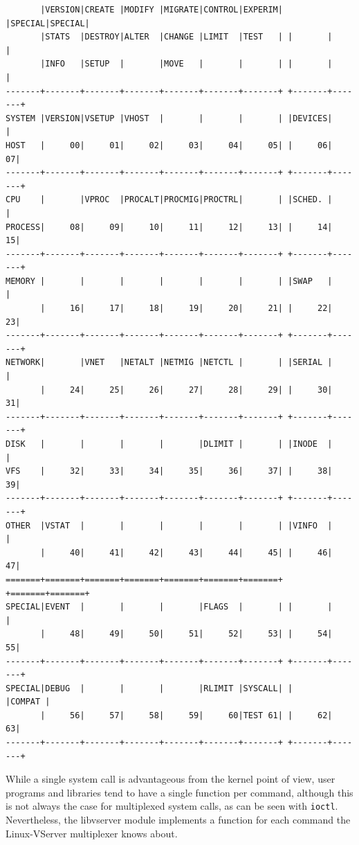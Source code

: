 \begin{center}
\small
\begin{verbatim}
       |VERSION|CREATE |MODIFY |MIGRATE|CONTROL|EXPERIM| |SPECIAL|SPECIAL|
       |STATS  |DESTROY|ALTER  |CHANGE |LIMIT  |TEST   | |       |       |
       |INFO   |SETUP  |       |MOVE   |       |       | |       |       |
-------+-------+-------+-------+-------+-------+-------+ +-------+-------+
SYSTEM |VERSION|VSETUP |VHOST  |       |       |       | |DEVICES|       |
HOST   |     00|     01|     02|     03|     04|     05| |     06|     07|
-------+-------+-------+-------+-------+-------+-------+ +-------+-------+
CPU    |       |VPROC  |PROCALT|PROCMIG|PROCTRL|       | |SCHED. |       |
PROCESS|     08|     09|     10|     11|     12|     13| |     14|     15|
-------+-------+-------+-------+-------+-------+-------+ +-------+-------+
MEMORY |       |       |       |       |       |       | |SWAP   |       |
       |     16|     17|     18|     19|     20|     21| |     22|     23|
-------+-------+-------+-------+-------+-------+-------+ +-------+-------+
NETWORK|       |VNET   |NETALT |NETMIG |NETCTL |       | |SERIAL |       |
       |     24|     25|     26|     27|     28|     29| |     30|     31|
-------+-------+-------+-------+-------+-------+-------+ +-------+-------+
DISK   |       |       |       |       |DLIMIT |       | |INODE  |       |
VFS    |     32|     33|     34|     35|     36|     37| |     38|     39|
-------+-------+-------+-------+-------+-------+-------+ +-------+-------+
OTHER  |VSTAT  |       |       |       |       |       | |VINFO  |       |
       |     40|     41|     42|     43|     44|     45| |     46|     47|
=======+=======+=======+=======+=======+=======+=======+ +=======+=======+
SPECIAL|EVENT  |       |       |       |FLAGS  |       | |       |       |
       |     48|     49|     50|     51|     52|     53| |     54|     55|
-------+-------+-------+-------+-------+-------+-------+ +-------+-------+
SPECIAL|DEBUG  |       |       |       |RLIMIT |SYSCALL| |       |COMPAT |
       |     56|     57|     58|     59|     60|TEST 61| |     62|     63|
-------+-------+-------+-------+-------+-------+-------+ +-------+-------+
\end{verbatim}
\end{center}

While a single system call is advantageous from the kernel point of view,
user programs and libraries tend to have a single function per command, although
this is not always the case for multiplexed system calls, as can be seen with
\texttt{ioctl}. Nevertheless, the libvserver module implements a function for
each command the Linux-VServer multiplexer knows about.

